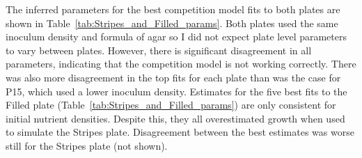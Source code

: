 \begin{multicols}{2}
The inferred parameters for the best competition model fits to both
plates are shown in Table~\ref{tab:Stripes_and_Filled_params}. Both
plates used the same inoculum density and formula of agar so I did not
expect plate level parameters to vary between plates. However, there
is significant disagreement in all parameters, indicating that the
competition model is not working correctly. There was also more
disagreement in the top fits for each plate than was the case for P15,
which used a lower inoculum density. Estimates for the five best fits
to the Filled plate (Table~\ref{tab:Stripes_and_Filled_params}) are
only consistent for initial nutrient densities. Despite this, they all
overestimated growth when used to simulate the Stripes
plate. Disagreement between the best estimates was worse still for the
Stripes plate (not shown).


\end{multicols}
